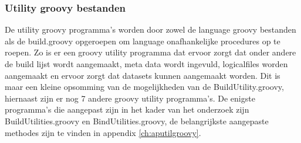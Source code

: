 \subsubsection{Utility groovy bestanden}
De utility groovy programma's worden door zowel de language groovy bestanden als de build.groovy opgeroepen om language onafhankelijke procedures op te roepen. Zo is er een groovy utility programma dat ervoor zorgt dat onder andere de build lijst wordt aangemaakt, meta data wordt ingevuld, logicalfiles worden aangemaakt en ervoor zorgt dat datasets kunnen aangemaakt worden. Dit is maar een kleine opsomming van de mogelijkheden van de BuildUtility.groovy, hiernaast zijn er nog 7 andere groovy utility programma's. De enigste programma's die aangepast zijn in het kader van het onderzoek zijn BuildUtilities.groovy en BindUtilities.groovy, de belangrijkste aangepaste methodes zijn te vinden in appendix \ref{ch:aputilgroovy}. 
\\ \\
